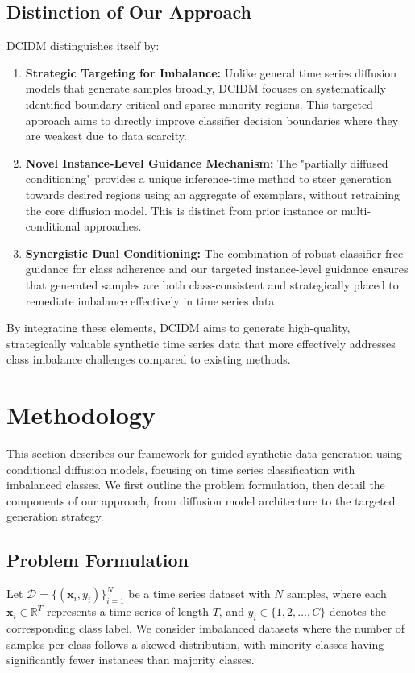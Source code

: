 \documentclass{article}
\begin{document}
\subsection{Distinction of Our Approach}
DCIDM distinguishes itself by:
\begin{enumerate}
    \item \textbf{Strategic Targeting for Imbalance:} Unlike general time series diffusion models that generate samples broadly, DCIDM focuses on systematically identified boundary-critical and sparse minority regions. This targeted approach aims to directly improve classifier decision boundaries where they are weakest due to data scarcity.
    \item \textbf{Novel Instance-Level Guidance Mechanism:} The "partially diffused conditioning" provides a unique inference-time method to steer generation towards desired regions using an aggregate of exemplars, without retraining the core diffusion model. This is distinct from prior instance or multi-conditional approaches.
    \item \textbf{Synergistic Dual Conditioning:} The combination of robust classifier-free guidance for class adherence and our targeted instance-level guidance ensures that generated samples are both class-consistent and strategically placed to remediate imbalance effectively in time series data.
\end{enumerate}
By integrating these elements, DCIDM aims to generate high-quality, strategically valuable synthetic time series data that more effectively addresses class imbalance challenges compared to existing methods.



\section{Methodology}

This section describes our framework for guided synthetic data generation using conditional diffusion models, focusing on time series classification with imbalanced classes. We first outline the problem formulation, then detail the components of our approach, from diffusion model architecture to the targeted generation strategy.

\subsection{Problem Formulation}

Let $\mathcal{D} = \{(\mathbf{x}_i, y_i)\}_{i=1}^N$ be a time series dataset with $N$ samples, where each $\mathbf{x}_i \in \mathbb{R}^T$ represents a time series of length $T$, and $y_i \in \{1, 2, \ldots, C\}$ denotes the corresponding class label. We consider imbalanced datasets where the number of samples per class follows a skewed distribution, with minority classes having significantly fewer instances than majority classes.
\end{document}
